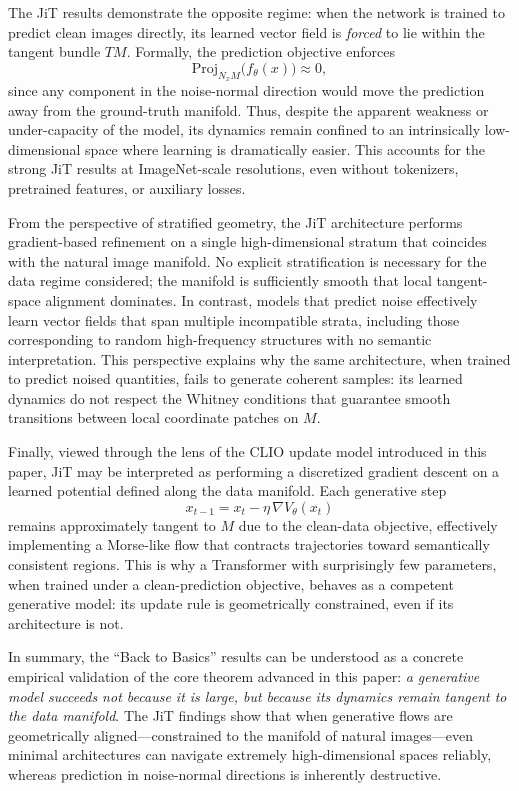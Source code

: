 \documentclass[11pt,a4paper,twocolumn]{article}
\begin{document}
The JiT results demonstrate the opposite regime:
when the network is trained to predict clean images directly,
its learned vector field is \emph{forced} to lie within the tangent bundle
$T M$.
Formally, the prediction objective enforces
\[
\mathrm{Proj}_{N_x M}\big(f_\theta(x)\big) \approx 0,
\]
since any component in the noise-normal direction would move the prediction
away from the ground-truth manifold.
Thus, despite the apparent weakness or under-capacity of the model,
its dynamics remain confined to an intrinsically low-dimensional space
where learning is dramatically easier.
This accounts for the strong JiT results at ImageNet-scale resolutions,
even without tokenizers, pretrained features, or auxiliary losses.

From the perspective of stratified geometry, the JiT architecture performs
gradient-based refinement on a single high-dimensional stratum that
coincides with the natural image manifold.
No explicit stratification is necessary for the data regime considered;
the manifold is sufficiently smooth that local tangent-space alignment
dominates.
In contrast, models that predict noise effectively learn vector fields that
span multiple incompatible strata, including those corresponding to random
high-frequency structures with no semantic interpretation.
This perspective explains why the same architecture, when trained to
predict noised quantities, fails to generate coherent samples:
its learned dynamics do not respect the Whitney conditions that guarantee
smooth transitions between local coordinate patches on $M$.

Finally, viewed through the lens of the CLIO update model introduced in this
paper, JiT may be interpreted as performing a discretized gradient descent
on a learned potential defined along the data manifold.
Each generative step
\[
x_{t-1} = x_t - \eta \,\nabla V_\theta(x_t)
\]
remains approximately tangent to $M$ due to the clean-data objective,
effectively implementing a Morse-like flow that contracts trajectories
toward semantically consistent regions.
This is why a Transformer with surprisingly few parameters, when trained
under a clean-prediction objective, behaves as a competent generative
model: its update rule is geometrically constrained, even if its architecture
is not.

In summary, the ``Back to Basics'' results can be understood as a concrete
empirical validation of the core theorem advanced in this paper:
\emph{a generative model succeeds not because it is large, but because
its dynamics remain tangent to the data manifold}.
The JiT findings show that when generative flows are geometrically
aligned---constrained to the manifold of natural images---even minimal
architectures can navigate extremely high-dimensional spaces reliably,
whereas prediction in noise-normal directions is inherently destructive.
\end{document}
